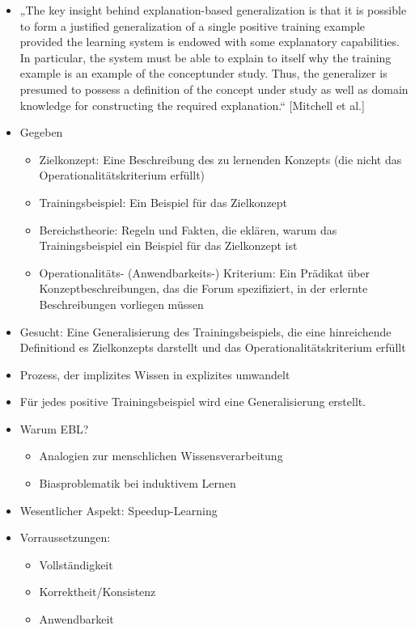 \documentclass[paper=a4, fontsize=11pt]{scrartcl} %
\numberwithin{equation}{section} %
\numberwithin{figure}{section} %
\numberwithin{table}{section} %
\begin{document}
\begin{itemize}
\item „The key insight behind explanation-based generalization is that it is possible to form a justified generalization of a single positive training example provided the learning system is endowed with some explanatory capabilities. In particular, the system must be able to explain to itself why the training example is an example of the conceptunder study. Thus, the generalizer is presumed to possess a definition of the concept under study as well as domain knowledge for constructing the required explanation.“ [Mitchell et al.]
\item Gegeben
\begin{itemize}
\item Zielkonzept: Eine Beschreibung des zu lernenden Konzepts (die nicht das Operationalitätskriterium erfüllt)
\item Trainingsbeispiel: Ein Beispiel für das Zielkonzept
\item Bereichstheorie: Regeln und Fakten, die eklären, warum das Trainingsbeispiel ein Beispiel für das Zielkonzept ist
\item Operationalitäts- (Anwendbarkeits-) Kriterium: Ein Prädikat über Konzeptbeschreibungen, das die Forum spezifiziert, in der erlernte Beschreibungen vorliegen müssen
\end{itemize}
\item Gesucht: Eine Generalisierung des Trainingsbeispiels, die eine hinreichende Definitiond es Zielkonzepts darstellt und das Operationalitätskriterium erfüllt
\item Prozess, der implizites Wissen in explizites umwandelt
\item Für jedes positive Trainingsbeispiel wird eine Generalisierung erstellt.
\item Warum EBL?
\begin{itemize}
\item Analogien zur menschlichen Wissensverarbeitung
\item Biasproblematik bei induktivem Lernen
\end{itemize}
\item Wesentlicher Aspekt: Speedup-Learning
\item Vorraussetzungen:
\begin{itemize}
\item Vollständigkeit
\item Korrektheit/Konsistenz
\item Anwendbarkeit
\end{itemize}

\end{itemize}
\end{document}

